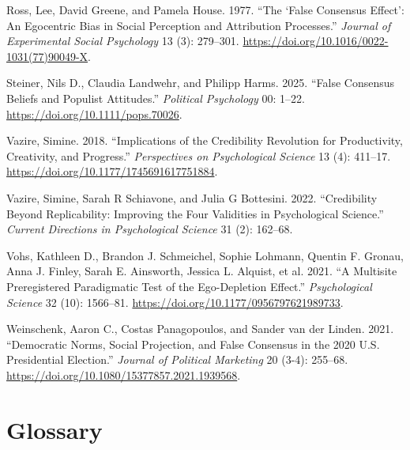 \documentclass[
  letterpaper,
]{book}
\newlength{\cslhangindent}
\newenvironment{CSLReferences}[2] %
 {\begin{list}{}{%
  \setlength{\itemindent}{0pt}
  \setlength{\leftmargin}{0pt}
  \setlength{\parsep}{0pt}
  \ifodd #1
   \setlength{\leftmargin}{\cslhangindent}
   \setlength{\itemindent}{-1\cslhangindent}
  \fi
  \setlength{\itemsep}{#2\baselineskip}}}
 {\end{list}}
\begin{document}
\begin{CSLReferences}{1}{0}
Ross, Lee, David Greene, and Pamela House. 1977. {``The {`False
Consensus Effect'}: {An} Egocentric Bias in Social Perception and
Attribution Processes.''} \emph{Journal of Experimental Social
Psychology} 13 (3): 279--301.
\url{https://doi.org/10.1016/0022-1031(77)90049-X}.

Steiner, Nils D., Claudia Landwehr, and Philipp Harms. 2025. {``False
Consensus Beliefs and Populist Attitudes.''} \emph{Political Psychology}
00: 1--22. \url{https://doi.org/10.1111/pops.70026}.

Vazire, Simine. 2018. {``Implications of the Credibility Revolution for
Productivity, Creativity, and Progress.''} \emph{Perspectives on
Psychological Science} 13 (4): 411--17.
\url{https://doi.org/10.1177/1745691617751884}.

Vazire, Simine, Sarah R Schiavone, and Julia G Bottesini. 2022.
{``Credibility Beyond Replicability: Improving the Four Validities in
Psychological Science.''} \emph{Current Directions in Psychological
Science} 31 (2): 162--68.

Vohs, Kathleen D., Brandon J. Schmeichel, Sophie Lohmann, Quentin F.
Gronau, Anna J. Finley, Sarah E. Ainsworth, Jessica L. Alquist, et al.
2021. {``A Multisite Preregistered Paradigmatic Test of the
Ego-Depletion Effect.''} \emph{Psychological Science} 32 (10): 1566--81.
\url{https://doi.org/10.1177/0956797621989733}.

Weinschenk, Aaron C., Costas Panagopoulos, and Sander van der Linden.
2021. {``Democratic {Norms}, {Social} {Projection}, and {False}
{Consensus} in the 2020 {U}.{S}. {Presidential} {Election}.''}
\emph{Journal of Political Marketing} 20 (3-4): 255--68.
\url{https://doi.org/10.1080/15377857.2021.1939568}.

\end{CSLReferences}


\chapter*{\texorpdfstring{{Glossary}}{Glossary}}\label{glossary}

\end{document}
